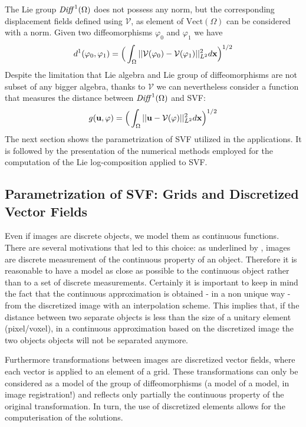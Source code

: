 The Lie group $\text{\emph{Diff}}^{1}(\Omega)$ does not possess any norm, but the corresponding displacement fields defined using $\mathcal{V}$, as element of $\text{Vect}(\Omega)$ can be considered with a norm. Given two diffeomorphisms $\varphi_0$ and $\varphi_1$ we have
\begin{align}\label{def:metric_two_displacement_field}
d^{1}(\varphi_0,\varphi_1) 
= 
\Big( \int_{\Omega} \vert\lvert \mathcal{V}(\varphi_0) - \mathcal{V}(\varphi_1) \rvert\vert_{L^2}^{2} d\mathbf{x} \Big)^{1/2}
\end{align} 
Despite the limitation that Lie algebra and Lie group of diffeomorphisms are not subset of any bigger algebra, thanks to $\mathcal{V} $ we can nevertheless consider a function that measures the distance between $\text{\emph{Diff}}^{1}(\Omega)$ and SVF:
\begin{align}\label{def:metric_one_svf_one_displacement_field}
g(\mathbf{u},\varphi) 
= 
\Big(\int_{\Omega} \vert\lvert \mathbf{u} - \mathcal{V}(\varphi) \rvert\vert_{L^2}^{2} d\mathbf{x} \Big)^{1/2}
\end{align} 
The next section shows the parametrization of SVF utilized in the applications. It is followed by the presentation of the numerical methods employed for the computation of the Lie log-composition applied to SVF.

\subsection{Parametrization of SVF: Grids and Discretized Vector Fields}\label{se:parametrization_SVF}

Even if images are discrete objects, we model them as continuous functions. There are several motivations that led to this choice: as underlined by \cite{szeliski1994image}, images are discrete measurement of the continuous property of an object. Therefore it is reasonable to have a model as close as possible to the continuous object rather than to a set of discrete measurements. 
Certainly it is important to keep in mind the fact that the continuous approximation is obtained - in a non unique way - from the discretized image with an interpolation scheme. This implies that, if the distance between two separate objects is less than the size of a unitary element (pixel/voxel), in a continuous approximation based on the discretized image the two objects objects will not be separated anymore. 

Furthermore transformations between images are discretized vector fields, where each vector is applied to an element of a grid. These transformations can only be considered as a model of the group of diffeomorphisms (a model of a model, in image registration!) and reflects only partially the continuous property of the original transformation.
In turn, the use of discretized elements allows for the computerisation of the solutions.

